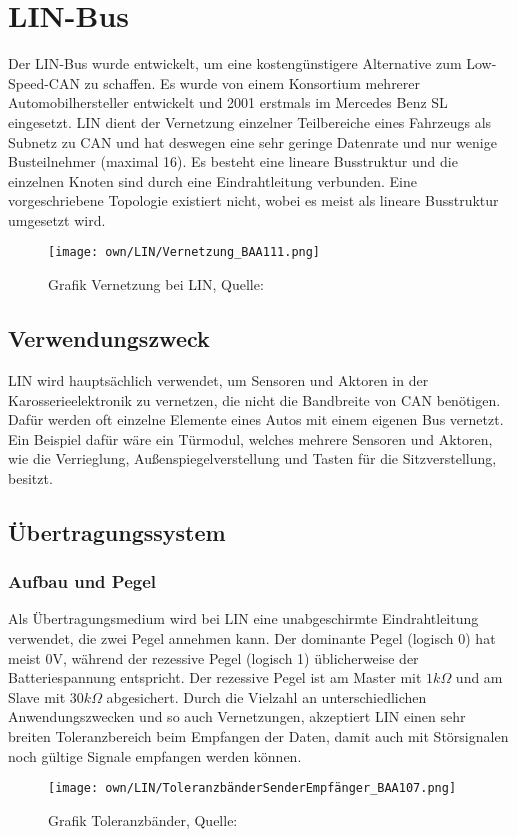 
\chapter{LIN-Bus}

Der \ac{LIN}-Bus wurde entwickelt, um eine kostengünstigere Alternative zum Low-Speed-CAN zu schaffen.
Es wurde von einem Konsortium mehrerer Automobilhersteller entwickelt und 2001 erstmals im Mercedes Benz SL eingesetzt.
\ac{LIN} dient der Vernetzung einzelner Teilbereiche eines Fahrzeugs als Subnetz zu \ac{CAN} und hat deswegen eine sehr geringe Datenrate und nur wenige Busteilnehmer (maximal 16).
Es besteht eine lineare Busstruktur und die einzelnen Knoten sind durch eine Eindrahtleitung verbunden. 
Eine vorgeschriebene Topologie existiert nicht, wobei es meist als lineare Busstruktur umgesetzt wird.
\begin{figure}[!htbp]
    \centering
    \texttt{[image: own/LIN/Vernetzung\_BAA111.png]}
    \caption{Grafik Vernetzung bei LIN, Quelle: \cite{BAA2011, S.111}}
    \label{fig:Toleranzbaender}
\end{figure}


\section{Verwendungszweck}
\ac{LIN} wird hauptsächlich verwendet, um Sensoren und Aktoren in der Karosserieelektronik zu vernetzen, die nicht die Bandbreite von \ac{CAN} benötigen.
Dafür werden oft einzelne Elemente eines Autos mit einem eigenen Bus vernetzt.
Ein Beispiel dafür wäre ein Türmodul, welches mehrere Sensoren und Aktoren, wie die Verrieglung, Außenspiegelverstellung und Tasten für die Sitzverstellung, besitzt.

\section{Übertragungssystem}
    \subsection{Aufbau und Pegel}
    Als Übertragungsmedium wird bei \ac{LIN} eine unabgeschirmte Eindrahtleitung verwendet, die zwei Pegel annehmen kann.
    Der dominante Pegel (logisch 0) hat meist 0V, während der rezessive Pegel (logisch 1) üblicherweise der Batteriespannung entspricht.
    Der rezessive Pegel ist am Master mit  $1k\Omega$  und am Slave mit $30k\Omega$  abgesichert.
    Durch die Vielzahl an unterschiedlichen Anwendungszwecken und so auch Vernetzungen, akzeptiert \ac{LIN} einen sehr breiten Toleranzbereich beim Empfangen der Daten, damit auch mit Störsignalen noch gültige Signale empfangen werden können. 
    \begin{figure}[!htbp]
        \centering
        \texttt{[image: own/LIN/ToleranzbänderSenderEmpfänger\_BAA107.png]}
        \caption{Grafik Toleranzbänder, Quelle: \cite{BAA2011, S.107}}
        \label{fig:Toleranzbaender}
    \end{figure}

